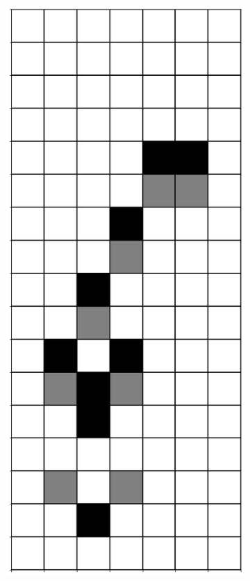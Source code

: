 \documentclass[12pt]{article}
\numberwithin{figure}{section} %
\begin{document}
\begin{figure}[H]
\begin{subfigure}{0.3\textwidth}
     		\includegraphics[angle=270,width=\linewidth]{Section4/14.0}

\end{subfigure}
\end{figure}
\end{document}
